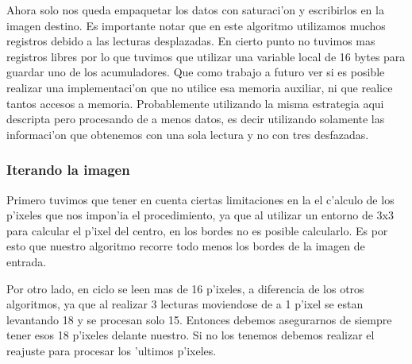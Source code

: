 Ahora solo nos queda empaquetar los datos con saturaci'on y escribirlos en la imagen destino. Es importante notar que en este algoritmo utilizamos muchos registros debido a las lecturas desplazadas. En cierto punto no tuvimos mas registros libres por lo que tuvimos que utilizar una variable local de 16 bytes para guardar uno de los acumuladores. Que como trabajo a futuro ver si es posible realizar una implementaci'on que no utilice esa memoria auxiliar, ni que realice tantos accesos a memoria. Probablemente utilizando la misma estrategia aqui descripta pero procesando de a menos datos, es decir utilizando solamente las informaci'on que obtenemos con una sola lectura y no con tres desfazadas.

\subsubsection*{Iterando la imagen}

Primero tuvimos que tener en cuenta ciertas limitaciones en la el c'alculo de los p'ixeles que nos impon'ia el procedimiento, ya que al utilizar un entorno de 3x3 para calcular el p'ixel del centro, en los bordes no es posible calcularlo. Es por esto que nuestro algoritmo recorre todo menos los bordes de la imagen de entrada. 

Por otro lado, en ciclo se leen mas de 16 p'ixeles, a diferencia de los otros algoritmos, ya que al realizar 3 lecturas moviendose de a 1 p'ixel se estan levantando 18 y se procesan solo 15. Entonces debemos asegurarnos de siempre tener esos 18 p'ixeles delante nuestro. Si no los tenemos debemos realizar el reajuste para procesar los 'ultimos p'ixeles. 
